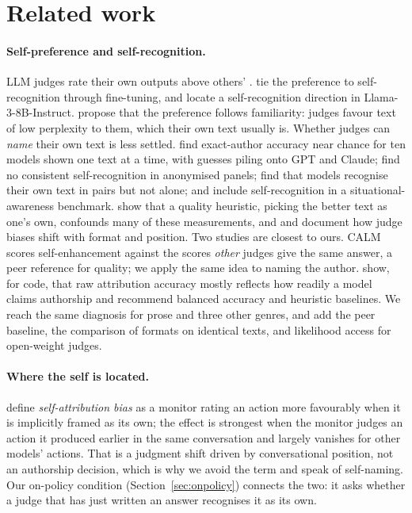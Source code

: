 \section{Related work}
\label{sec:related}

\paragraph{Self-preference and self-recognition.}
LLM judges rate their own outputs above others'
\citep{panickssery2024selfpreference, wataoka2024perplexity, ye2025justice}.
\citet{panickssery2024selfpreference} tie the preference to self-recognition
through fine-tuning, and \citet{ackerman2025inspection} locate a
self-recognition direction in Llama-3-8B-Instruct.
\citet{wataoka2024perplexity} propose that the preference follows
familiarity: judges favour text of low perplexity to them, which their own
text usually is. Whether judges can \emph{name} their own text is less
settled. \citet{bai2025selfrecognition} find exact-author accuracy near chance
for ten models shown one text at a time, with guesses piling onto GPT and
Claude; \citet{davidson2024anonymized} find no consistent self-recognition in
anonymised panels; \citet{zhou2025implicit} find that models recognise their
own text in pairs but not alone; and \citet{laine2024sad} include
self-recognition in a situational-awareness benchmark.
\citet{stamand2026sgtr} show that a quality heuristic, picking the
better text as one's own, confounds many of these measurements, and
\citet{roytburg2026narcissists} and \citet{shi2025positionbias} document how
judge biases shift with format and position. Two studies are closest to
ours. CALM \citep{ye2025justice} scores self-enhancement against the scores
\emph{other} judges give the same answer, a peer reference for quality; we
apply the same idea to naming the author. \citet{barkhordar2026stylenotself}
show, for code, that raw attribution accuracy mostly reflects how readily a
model claims authorship and recommend balanced accuracy and heuristic
baselines. We reach the same diagnosis for prose and three other genres, and
add the peer baseline, the comparison of formats on identical texts, and
likelihood access for open-weight judges.

\paragraph{Where the self is located.}
\citet{khullar2026selfattribution} define \emph{self-attribution bias} as a
monitor rating an action more favourably when it is implicitly framed as its
own; the effect is strongest when the monitor judges an action it produced
earlier in the same conversation and largely vanishes for other models'
actions. That is a judgment shift driven by conversational position, not an
authorship decision, which is why we avoid the term and speak of self-naming.
Our on-policy condition (Section~\ref{sec:onpolicy}) connects the two: it
asks whether a judge that has just written an answer recognises it as its
own.

